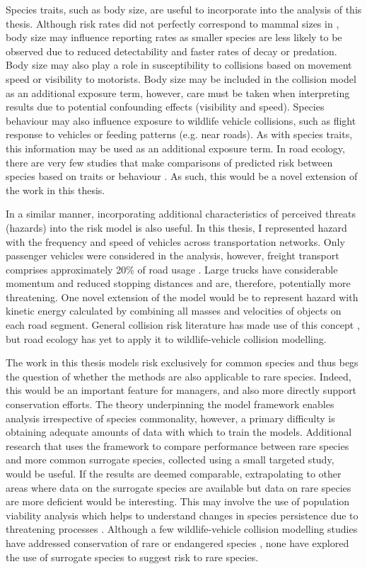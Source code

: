 Species traits, such as body size, are useful to incorporate into the analysis of this thesis. Although risk rates did not perfectly correspond to mammal sizes in , body size may influence reporting rates as smaller species are less likely to be observed due to reduced detectability and faster rates of decay or predation. Body size may also play a role in susceptibility to collisions based on movement speed \citep{jaar06} or visibility to motorists. Body size may be included in the collision model as an additional exposure term, however, care must be taken when interpreting results due to potential confounding effects (visibility and speed). Species behaviour may also influence exposure to wildlife vehicle collisions, such as flight response to vehicles \citep{deva14,lee10} or feeding patterns (e.g. near roads). As with species traits, this information may be used as an additional exposure term. In road ecology, there are very few studies that make comparisons of predicted risk between species based on traits or behaviour \citep[but see][]{litv08}. As such, this would be a novel extension of the work in this thesis. 

In a similar manner, incorporating additional characteristics of perceived threats (hazards) into the risk model is also useful. In this thesis, I represented hazard with the frequency and speed of vehicles across transportation networks. Only passenger vehicles were considered in the analysis, however, freight transport comprises approximately 20\% of road usage \citep{abs16}. Large trucks have considerable momentum and reduced stopping distances and are, therefore, potentially more threatening. One novel extension of the model would be to represent hazard with kinetic energy calculated by combining all masses and velocities of objects on each road segment. General collision risk literature has made use of this concept \citep{aart06}, but road ecology has yet to apply it to wildlife-vehicle collision modelling.

The work in this thesis models risk exclusively for common species and thus begs the question of whether the methods are also applicable to rare species. Indeed, this would be an important feature for managers, and also more directly support conservation efforts. The theory underpinning the model framework enables analysis irrespective of species commonality, however, a primary difficulty is obtaining adequate amounts of data with which to train the models. Additional research that uses the framework to compare performance between rare species and more common surrogate species, collected using a small targeted study, would be useful. If the results are deemed comparable, extrapolating to other areas where data on the surrogate species are available but data on rare species are more deficient would be interesting. This may involve the use of population viability analysis which helps to understand changes in species persistence due to threatening processes \citep{rhod14}. Although a few wildlife-vehicle collision modelling studies have addressed conservation of rare or endangered species \citep{dwye16}, none have explored the use of surrogate species to suggest risk to rare species.

